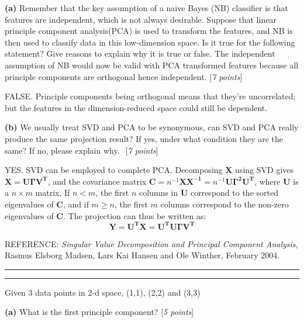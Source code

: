 \documentclass[11pt]{article}
\newcounter{marks}
\def\maxmarks#1{\extramark{#1}\addtocounter{marks}{#1}}
\def\extramark#1{\hfill
  [\emph{#1 points}]\\
}
\newcommand{\myfirstta}{Kuo Liu}
\newcommand{\question}[2] {\vspace{.25in} \hrule\vspace{0.5em} \noindent{\bf #1: #2} \vspace{0.5em} \hrule \vspace{.10in}}
\renewcommand{\part}[1] {\vspace{.10in} {\bf (#1)}}
\begin{document}
\part{a}
Remember that the key assumption of a naive Bayes (NB) classifier is that features are independent, which is not always desirable. Suppose that linear principle component analysis(PCA) is used to transform the features, and NB is then used to classify data in this low-dimension space. Is it true for the following  statement? Give reasons to explain why it is true or false. The independent assumption of NB  would now be valid with PCA transformed features because all principle components are orthogonal hence independent. 
\maxmarks{7} 

{\color{blue} FALSE. Principle components being orthogonal means that they're uncorrelated; 
but the features in the dimension-reduced space could still be dependent. }

\part{b}
We usually treat SVD and PCA to be synonymous, can SVD and PCA really produce the same projection result? If yes, under what condition they are the same? If no, please explain why. ${}_{}$
\maxmarks{7}  

{\color{blue} YES. SVD can be employed to complete PCA. Decomposing $\mathbf{X}$ using SVD
gives $\mathbf{X=U\Gamma V^T}$, and the covariance matrix $\mathbf{C}=n^{-1}
\mathbf{XX^{-1}}=n^{-1}\mathbf{U\Gamma^2U^T}$, where $\mathbf{U}$ is a $n\times m$ matrix.
If $n<m$, the first $n$ columns in $\mathbf{U}$ correspond to the sorted eigenvalues of
$\mathbf{C}$, and if $m\ge n$, the first $m$ columns correspond to the non-zero eigenvalues 
of $\mathbf{C}$. The projection can thus be written as:
\begin{equation}
\mathbf{Y=U^TX=U^TU\Gamma V^T}
\end{equation}

REFERENCE: {\it Singular Value Decomposition and Principal Component Analysis}, 
Rasmus Elsborg Madsen, Lars Kai Hansen and Ole Winther, February 2004. }

\question{2} {PCA II (TA:- \myfirstta)}
 Given 3 data points in 2-d space, (1,1), (2,2) and (3,3)
 
\part{a}
What is the first principle component?
\maxmarks{5}
\end{document}
